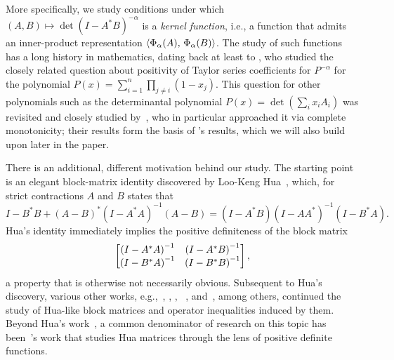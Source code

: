 \documentclass[11pt]{article}
\begin{document}
More specifically, we study conditions under which $(A,B) \mapsto \det(I-A^*B)^{-\alpha}$ is a \emph{kernel function}, i.e., a function that admits an inner-product representation $\langle {\Phi_\alpha(A)},\, {\Phi_\alpha(B)} \rangle$. The study of such functions has a long history in mathematics, dating back at least to \citet{szego1933}, who studied the closely related question about positivity of Taylor series coefficients for $P^{-\alpha}$ for the polynomial $P(x) = \sum_{i=1}^n\prod_{j\neq i}(1-x_j)$. This question for other polynomials such as the determinantal polynomial $P(x) = \det(\sum_i x_iA_i)$  was revisited and closely studied by~\citet{scott2014}, who in particular approached it via complete monotonicity; their results form the basis of \citet{branden2012}'s results, which we will also build upon later in the paper.

There is an additional, different motivation behind our study. The starting point is an elegant block-matrix identity discovered by Loo-Keng Hua~\citep{hua1955}, which, for strict contractions $A$ and $B$ states that
\begin{equation*}
  I-B^*B + (A-B)^*(I-A^*A)^{-1}(A-B) = (I-A^*B)(I-AA^*)^{-1}(I-B^*A).
\end{equation*}
Hua's identity immediately implies the positive definiteness of the block matrix
\begin{equation*}
  \begin{bmatrix}
    {(I-A^*A)}^{-1} & {(I-A^*B)}^{-1}\\
    {(I-B^*A)}^{-1} & {(I-B^*B)}^{-1}
  \end{bmatrix},
\end{equation*}
a property that is otherwise not necessarily obvious. Subsequent to Hua's discovery, various other works, e.g.,~\citep{marcus1958}, \citep{bellman1959}, \citep{ando1980}, ~\citep{xuXu2009,xuXu2011}, and~\citep{fzhang2009}, among others, continued the study of Hua-like block matrices and operator inequalities induced by them.  %
Beyond Hua's work~\citep{hua1955}, a common  denominator of research on this topic has been~\citet{bellman1959}'s work that studies Hua matrices through the lens of positive definite functions. %
\end{document}
